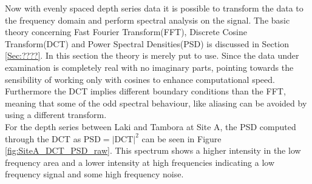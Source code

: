 \documentclass[../../CompleteThesis/Complete_1stDraft.tex]{subfiles}
\begin{document}
Now with evenly spaced depth series data it is possible to transform the data to the frequency domain and perform spectral analysis on the signal. The basic theory concerning Fast Fourier Transform(FFT), Discrete Cosine Transform(DCT) and Power Spectral Densities(PSD) is discussed in Section \ref{Sec:????}. In this section the theory is merely put to use. Since the data under examination is completely real with no imaginary parts, pointing towards the sensibility of working only with cosines to enhance computational speed. Furthermore the DCT implies different boundary conditions than the FFT, meaning that some of the odd spectral behaviour, like aliasing can be avoided by using a different transform.\\
For the depth series between Laki and Tambora at Site A, the PSD computed through the DCT as $\text{PSD} = |\text{DCT}|^2$ can be seen in Figure \ref{fig:SiteA_DCT_PSD_raw}. This spectrum shows a higher intensity in the low frequency area and a lower intensity at high frequencies indicating a low frequency signal and some high frequency noise.
\end{document}
